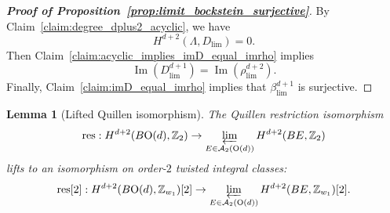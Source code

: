 \documentclass[aps,prx,reprint,superscriptaddress,twocolumn,amsmath,amssymb,amsfonts, nofootinbib]{revtex4-2}
\theoremstyle{apsstyle}
\newtheorem{lemma}{Lemma}
\begin{document}
\begin{proof}[\textnormal{\textbf{Proof of Proposition~\ref{prop:limit_bockstein_surjective}}}]
By Claim~\ref{claim:degree_dplus2_acyclic}, we have
\begin{equation}
H^{d+2}(\Lambda,D_{\lim})=0.
\end{equation}
Then Claim~\ref{claim:acyclic_implies_imD_equal_imrho} implies
\begin{equation}
\operatorname{Im}(D_{\lim}^{d+1})
=
\operatorname{Im}(\rho_{\lim}^{d+2}).
\end{equation}
Finally, Claim~\ref{claim:imD_equal_imrho} implies that $\beta_{\lim}^{d+1}$ is surjective.
\end{proof}

\bigskip 

\begin{lemma}[Lifted Quillen isomorphism]
\label{lemma:lift_quillen}
The Quillen restriction isomorphism
\begin{equation*}
    \mathrm{res}:H^{d+2}(B\mathrm{O}(d), \mathbb{Z}_{2})\to \varprojlim\limits_{E\in \mathcal{A}_{2}(\mathrm{O}(d))}H^{d+2}(BE, \mathbb{Z}_{2})
\end{equation*}
lifts to an isomorphism on order-$2$ twisted integral classes: 
\begin{equation*}
    \mathrm{res}[2]:H^{d+2}(B\mathrm{O}(d), \mathbb{Z}_{w_{1}})[2]\to \varprojlim\limits_{E\in \mathcal{A}_{2}(\mathrm{O}(d))}H^{d+2}(BE, \mathbb{Z}_{w_{1}})[2].
\end{equation*}
\end{lemma}
\end{document}
